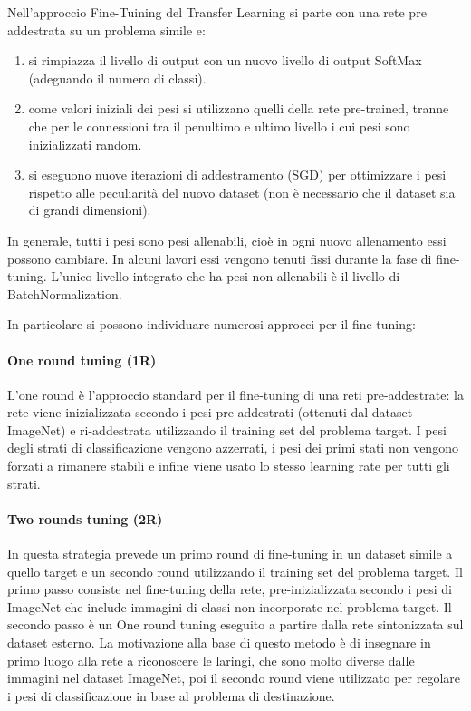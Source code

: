 Nell'approccio Fine-Tuining del Transfer Learning si parte con una rete pre addestrata su un problema simile e:
\begin{enumerate}
    \item si rimpiazza il livello di output con un nuovo livello di output SoftMax (adeguando il numero di classi).
    \item come valori iniziali dei pesi si utilizzano quelli della rete pre-trained, tranne che per le connessioni tra il penultimo e ultimo livello i cui pesi sono inizializzati random.
    \item si eseguono nuove iterazioni di addestramento (SGD) per ottimizzare i pesi rispetto alle peculiarità del nuovo dataset (non è necessario che il dataset sia di grandi dimensioni).
\end{enumerate}

In generale, tutti i pesi sono pesi allenabili, cioè in  ogni nuovo allenamento essi possono cambiare. In alcuni lavori essi vengono tenuti fissi durante la fase di fine-tuning. L'unico livello integrato che ha pesi non allenabili è il livello di BatchNormalization\cite{team_keras_nodate}\cite{lumini_plankton}.

In particolare si possono individuare numerosi approcci per il fine-tuning:
\paragraph {One round tuning (1R)} \label{one-round-tuning}

L'one round è l'approccio standard per il fine-tuning di una reti pre-addestrate: la rete viene inizializzata secondo i pesi pre-addestrati (ottenuti dal dataset ImageNet) e ri-addestrata utilizzando il training set del problema target. I pesi degli strati di classificazione vengono azzerrati, i pesi dei primi stati non vengono forzati a rimanere stabili e infine viene usato lo stesso learning rate per tutti gli strati\cite{lumini_plankton}. 

\paragraph{Two rounds tuning (2R)} \label{two-round-tuning}

In questa strategia prevede un primo round di fine-tuning in un dataset simile a quello target e un secondo round utilizzando il training set del problema target. Il primo passo consiste nel fine-tuning della rete, pre-inizializzata secondo i pesi di ImageNet che include immagini di classi non incorporate nel problema target. Il secondo passo è un One round tuning eseguito a partire dalla rete sintonizzata sul dataset esterno. La motivazione alla base di questo metodo è di insegnare in primo luogo alla rete a riconoscere le laringi, che sono molto diverse dalle immagini nel dataset ImageNet, poi il secondo round viene utilizzato per regolare i pesi di classificazione in base al problema di destinazione\cite{lumini_plankton}.


